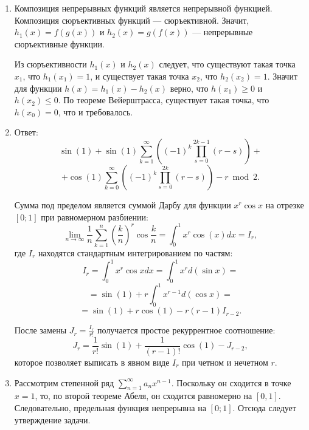 \begin{enumerate}

\item Композиция непрерывных функций является непрерывной функцией. Композиция сюръективных функций --- сюръективной. Значит, $h_1(x) = f(g(x))$ и $h_2(x) = g(f(x))$ --- непрерывные сюръективные функции. 

Из сюръективности $h_1(x)$ и $h_2(x)$ следует, что существуют такая точка $x_1$, что  $h_1(x_1) = 1$, и существует такая точка $x_2$, что $h_2(x_2) = 1$. Значит для функции $h(x) = h_1(x) - h_2(x)$ верно, что $h(x_1) \geqslant 0$ и $h(x_2) \leqslant 0$. По теореме Вейерштрасса, существует такая точка, что $h(x_0) = 0$, что и требовалось.

\begin{comment}
\item {НЕТ} На $n$ человек надевают шапки $k$ цветов (шапок каждого цвета может быть любое количество). Люди видят, что надето на других, но свою шапку не видит никто. Затем каждый пишет на бумажке цвет; если указанный человеком цвет совпал с цветом его шапки, то всей команде даётся 1 балл. Сколько баллов может гарантировать себе команда из $n$ человек?
\end{comment}

\item Ответ: 
$$\sin(1) + \sin(1) \sum_{k=1}^{\infty} \left( (-1)^k \prod_{s=0}^{2k-1} (r-s) \right) + $$
$$ + \cos(1) \sum_{k=0}^{\infty} \left( (-1)^k \prod_{s=0}^{2k} (r-s) \right) - r \bmod 2.$$

Сумма под пределом является суммой Дарбу для функции $x^r \cos{x}$ на отрезке $[0; 1]$ при равномерном разбиении:
$$\lim_{n \rightarrow \infty} \frac{1}{n} \sum_{k=1}^n \left( \frac{k}{n} \right)^r \cos \frac{k}{n} = \int_{0}^{1} x^r \cos(x) dx = I_r,$$
где $I_r$ находятся стандартным интегрированием по частям: 
$$I_r = 
\int_{0}^{1} x^r \cos{x} dx = 
\int_{0}^{1} x^r d(\sin{x}) = $$
$$ = \sin(1) + r \int_{0}^{1} x^{r-1} d(\cos{x}) = $$
$$ =\sin(1) + r \cos(1) - r(r-1) I_{r-2}.$$

После замены $J_r = \frac{I_r}{r!}$ получается простое рекуррентное соотношение:
$$J_r = \frac{1}{r!} \sin(1) + \frac{1}{(r-1)!} \cos(1) - J_{r-2},$$
которое позволяет выписать в явном виде $I_r$ при четном и нечетном $r$.


\item Рассмотрим степенной ряд $\sum_{n=1}^{\infty} a_n x^{n-1}$. Поскольку он сходится в точке $x=1$, то, по второй теореме Абеля, он сходится равномерно на $[0, 1]$. Следовательно, предельная функция непрерывна на $[0; 1]$. Отсюда следует утверждение задачи.


\end{enumerate}
